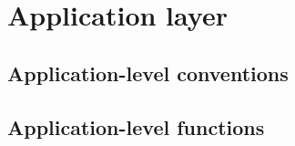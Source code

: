 \chapter{Application layer}\label{sec:application_layer}

\section{Application-level conventions}\label{sec:application_level_conventions}

\section{Application-level functions}\label{sec:application_level_functions}

